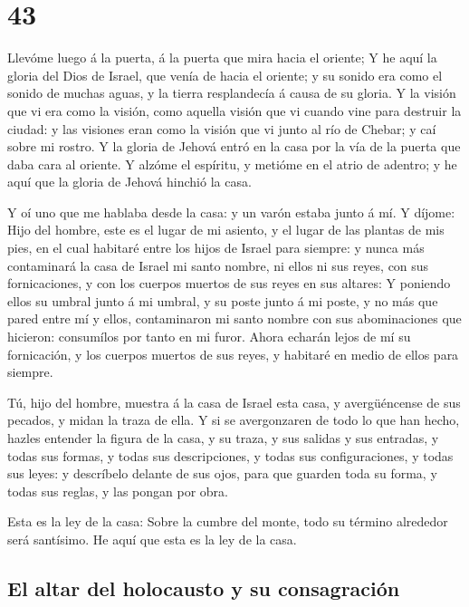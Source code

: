 \hypertarget{section-26-43}{%
\section{43}\label{section-26-43}}

 Llevóme luego á la puerta, á la puerta que mira hacia el
oriente;  Y he aquí la gloria del Dios de Israel, que
venía de hacia el oriente; y su sonido era como el sonido de muchas
aguas, y la tierra resplandecía á causa de su gloria.  Y
la visión que vi era como la visión, como aquella visión que vi cuando
vine para destruir la ciudad: y las visiones eran como la visión que vi
junto al río de Chebar; y caí sobre mi rostro.  Y la
gloria de Jehová entró en la casa por la vía de la puerta que daba cara
al oriente.  Y alzóme el espíritu, y metióme en el atrio
de adentro; y he aquí que la gloria de Jehová hinchió la casa.

 Y oí uno que me hablaba desde la casa: y un varón estaba
junto á mí.  Y díjome: Hijo del hombre, este es el lugar
de mi asiento, y el lugar de las plantas de mis pies, en el cual
habitaré entre los hijos de Israel para siempre: y nunca más contaminará
la casa de Israel mi santo nombre, ni ellos ni sus reyes, con sus
fornicaciones, y con los cuerpos muertos de sus reyes en sus altares:
 Y poniendo ellos su umbral junto á mi umbral, y su poste
junto á mi poste, y no más que pared entre mí y ellos, contaminaron mi
santo nombre con sus abominaciones que hicieron: consumílos por tanto en
mi furor.  Ahora echarán lejos de mí su fornicación, y los
cuerpos muertos de sus reyes, y habitaré en medio de ellos para siempre.

 Tú, hijo del hombre, muestra á la casa de Israel esta
casa, y avergüéncense de sus pecados, y midan la traza de ella.
 Y si se avergonzaren de todo lo que han hecho, hazles
entender la figura de la casa, y su traza, y sus salidas y sus entradas,
y todas sus formas, y todas sus descripciones, y todas sus
configuraciones, y todas sus leyes: y descríbelo delante de sus ojos,
para que guarden toda su forma, y todas sus reglas, y las pongan por
obra.

 Esta es la ley de la casa: Sobre la cumbre del monte,
todo su término alrededor será santísimo. He aquí que esta es la ley de
la casa.

\hypertarget{el-altar-del-holocausto-y-su-consagraciuxf3n}{%
\subsection{El altar del holocausto y su
consagración}\label{el-altar-del-holocausto-y-su-consagraciuxf3n}}

